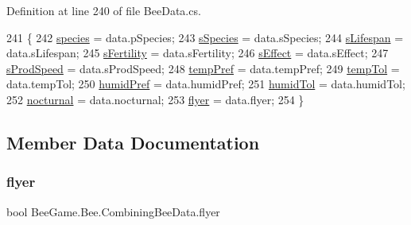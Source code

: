 Definition at line 240 of file Bee\+Data.\+cs.


\begin{DoxyCode}
241         \{
242             \hyperlink{struct_bee_game_1_1_bee_1_1_combining_bee_data_a7e519ea913d51073b7da7815e85a4eeb}{species} = data.pSpecies;
243             \hyperlink{struct_bee_game_1_1_bee_1_1_combining_bee_data_a8359d180e7a0704e81bb7f37b9aac021}{sSpecies} = data.sSpecies;
244             \hyperlink{struct_bee_game_1_1_bee_1_1_combining_bee_data_a2635fae2aa8e50991d7733624883e671}{sLifespan} = data.sLifespan;
245             \hyperlink{struct_bee_game_1_1_bee_1_1_combining_bee_data_a02566c65413bebc23e767561c17510d5}{sFertility} = data.sFertility;
246             \hyperlink{struct_bee_game_1_1_bee_1_1_combining_bee_data_a6706a04242c477e5934d779fde7e7b8e}{sEffect} = data.sEffect;
247             \hyperlink{struct_bee_game_1_1_bee_1_1_combining_bee_data_a253d2a55fe2cb1a3d01492a6f961b995}{sProdSpeed} = data.sProdSpeed;
248             \hyperlink{struct_bee_game_1_1_bee_1_1_combining_bee_data_a93f8cb5caf0b68dd597da1b3ab9e27b5}{tempPref} = data.tempPref;
249             \hyperlink{struct_bee_game_1_1_bee_1_1_combining_bee_data_a31cebfaca3139379e30a43fa0ac7e338}{tempTol} = data.tempTol;
250             \hyperlink{struct_bee_game_1_1_bee_1_1_combining_bee_data_ab9a9a9623d942632f8007711b65f909e}{humidPref} = data.humidPref;
251             \hyperlink{struct_bee_game_1_1_bee_1_1_combining_bee_data_a98c56c89bcd5f983b4d022c113f789e3}{humidTol} = data.humidTol;
252             \hyperlink{struct_bee_game_1_1_bee_1_1_combining_bee_data_a337800df462a764c58328d21d2398d6c}{nocturnal} = data.nocturnal;
253             \hyperlink{struct_bee_game_1_1_bee_1_1_combining_bee_data_ac0af7556cf90035ff830a6e121e8d4c4}{flyer} = data.flyer;
254         \}
\end{DoxyCode}


\subsection{Member Data Documentation}
\mbox{\label{struct_bee_game_1_1_bee_1_1_combining_bee_data_ac0af7556cf90035ff830a6e121e8d4c4}} 
\subsubsection{\texorpdfstring{flyer}{flyer}}
{\footnotesize\ttfamily bool Bee\+Game.\+Bee.\+Combining\+Bee\+Data.\+flyer}



